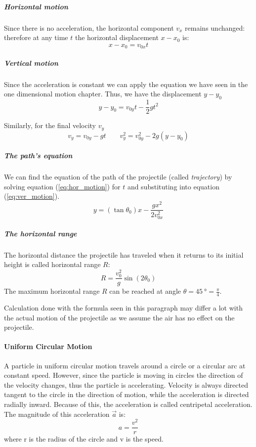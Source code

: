 \documentclass{scrartcl}
\begin{document}
    \subparagraph{Horizontal motion} Since there is no acceleration, the horizontal component $v_x$ remains unchanged: therefore at any time $t$ the horizontal displacement $x - x_0$ is:
    \begin{equation}\label{eq:hor_motion}
        x - x_0 = v_{0x}t
    \end{equation}
    
    \subparagraph{Vertical motion} Since the acceleration is constant we can apply the equation we have seen in the one dimensional motion chapter. Thus, we have the displacement $y- y_0$
    \begin{equation}\label{eq:ver_motion}
        y - y_0 = v_{0y}t - \frac{1}{2}gt^2
    \end{equation}

    Similarly, for the final velocity $v_y$
    \begin{equation}
        v_y = v_{0y} - gt\qquad v^2_y = v_{0y}^2 - 2g(y-y_0)
    \end{equation}
    \subparagraph{The path's equation} We can find the equation of the path of the projectile (called \emph{trajectory}) by solving equation (\ref{eq:hor_motion}) for $t$ and substituting into equation (\ref{eq:ver_motion}).
    \begin{equation}
        y = (\tan \theta_0)x - \frac{gx^2}{2v_{0x}^2}
    \end{equation}
    \subparagraph{The horizontal range} The horizontal distance the projectile has traveled when it returns to its initial height is called horizontal range $R$:
    \begin{equation}
        R = \frac{v^2_0}{g} \sin(2\theta_0)
    \end{equation}
    The maximum horizontal range $R$ can be reached at angle $\theta = \SI{45}{\degree}=\frac{\pi}{4}$.
    
    Calculation done with the formula seen in this paragraph may differ a lot with the actual motion of the projectile as we assume the air has no effect on the projectile. 
    
    \paragraph{Uniform Circular Motion} A particle in uniform circular motion travels around a circle or a circular arc at constant speed. However, since the particle is moving in circles the direction of the velocity changes, thus the particle is accelerating. Velocity is always directed tangent to the circle in the direction of motion, while the acceleration is directed radially inward. Because of this, the acceleration is called centripetal acceleration. The magnitude of this acceleration $\vec{a}$ is:
    \begin{equation}
        a = \frac{v^2}{r}
    \end{equation}
    where r is the radius of the circle and v is the speed.
    
\end{document}
